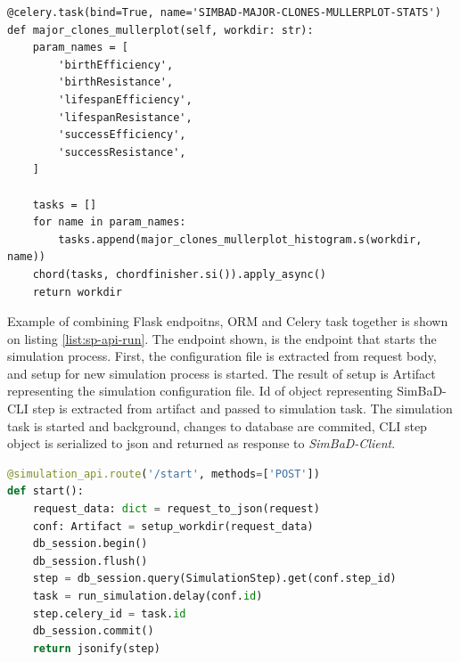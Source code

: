 \begin{lstlisting}[label=list:sp-celery-chord,caption=Start simulation endpoint, basicstyle=\footnotesize\ttfamily]
@celery.task(bind=True, name='SIMBAD-MAJOR-CLONES-MULLERPLOT-STATS')
def major_clones_mullerplot(self, workdir: str):
    param_names = [
        'birthEfficiency',
        'birthResistance',
        'lifespanEfficiency',
        'lifespanResistance',
        'successEfficiency',
        'successResistance',
    ]

    tasks = []
    for name in param_names:
        tasks.append(major_clones_mullerplot_histogram.s(workdir, name))
    chord(tasks, chordfinisher.si()).apply_async()
    return workdir
\end{lstlisting}
Example of combining Flask endpoitns, ORM and Celery task together is shown on listing \ref{list:sp-api-run}. The endpoint shown, is the endpoint that starts the simulation process.
First, the configuration file is extracted from request body, and setup for new simulation process is started. The result of setup is Artifact representing the simulation configuration file. Id of object representing SimBaD-CLI step is extracted from artifact and passed to simulation task. The simulation task is started and background, changes to database are commited, CLI step object is serialized to json and returned as response to \textit{SimBaD-Client}.
\begin{lstlisting}[label=list:sp-api-run,caption=Start simulation endpoint, basicstyle=\footnotesize\ttfamily, language=python]
@simulation_api.route('/start', methods=['POST'])
def start():
    request_data: dict = request_to_json(request)
    conf: Artifact = setup_workdir(request_data)
    db_session.begin()
    db_session.flush()
    step = db_session.query(SimulationStep).get(conf.step_id)
    task = run_simulation.delay(conf.id)
    step.celery_id = task.id
    db_session.commit()
    return jsonify(step)
\end{lstlisting}
